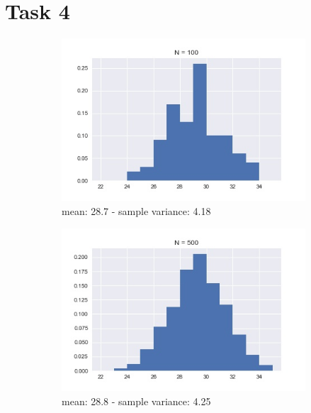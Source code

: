 \documentclass{article}
\begin{document}
\section*{Task 4}
\begin{figure}[h!]
  \centering
  \begin{subfigure}[b]{0.45\linewidth}
    \includegraphics[width=\linewidth]{Edit_Distance_Histogram_100.jpg}
    \caption{mean: 28.7 - sample variance: 4.18}
  \end{subfigure}
  \begin{subfigure}[b]{0.45\linewidth}
    \includegraphics[width=\linewidth]{Edit_Distance_Histogram_500.jpg}
    \caption{mean: 28.8 - sample variance: 4.25}
  \end{subfigure}
  \begin{subfigure}[b]{0.45\linewidth}

\end{subfigure}
\end{figure}
\end{document}
